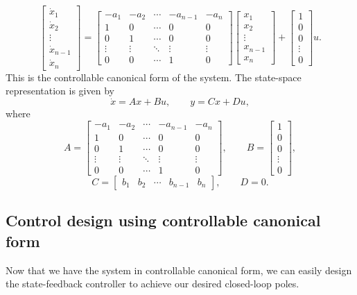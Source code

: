 \documentclass{ee122_notes}
\begin{document}
\[
\begin{bmatrix}\dot{x}_1 \\ \dot{x}_2 \\ \vdots \\ \dot{x}_{n-1} \\ \dot{x}_n\end{bmatrix} = \begin{bmatrix}
-a_1 & -a_2 & \cdots & -a_{n-1} & -a_n \\
1 & 0 & \cdots & 0 & 0 \\
0 & 1 & \cdots & 0 & 0 \\
\vdots & \vdots & \ddots & \vdots & \vdots \\
0 & 0 & \cdots & 1 & 0
\end{bmatrix} \begin{bmatrix}x_1 \\ x_2 \\ \vdots \\ x_{n-1} \\ x_n\end{bmatrix} + \begin{bmatrix}1 \\ 0 \\ 0 \\ \vdots \\ 0\end{bmatrix} u.
\]
This is the controllable canonical form of the system. The state-space representation is given by
\[
\dot{x} = Ax + Bu, \qquad y = Cx + Du,
\]
where
\[
A = \begin{bmatrix}
-a_1 & -a_2 & \cdots & -a_{n-1} & -a_n \\
1 & 0 & \cdots & 0 & 0 \\
0 & 1 & \cdots & 0 & 0 \\
\vdots & \vdots & \ddots & \vdots & \vdots \\
0 & 0 & \cdots & 1 & 0
\end{bmatrix}, \qquad B = \begin{bmatrix}1 \\ 0 \\ 0 \\ \vdots \\ 0\end{bmatrix}, 
\]
\[ C = \begin{bmatrix}b_1 & b_2 & \cdots & b_{n-1} & b_n\end{bmatrix}, \qquad D = 0.
\]
\subsection{Control design using controllable canonical form}
Now that we have the system in controllable canonical form, we can easily design the state-feedback controller to achieve our desired closed-loop poles.
\end{document}

